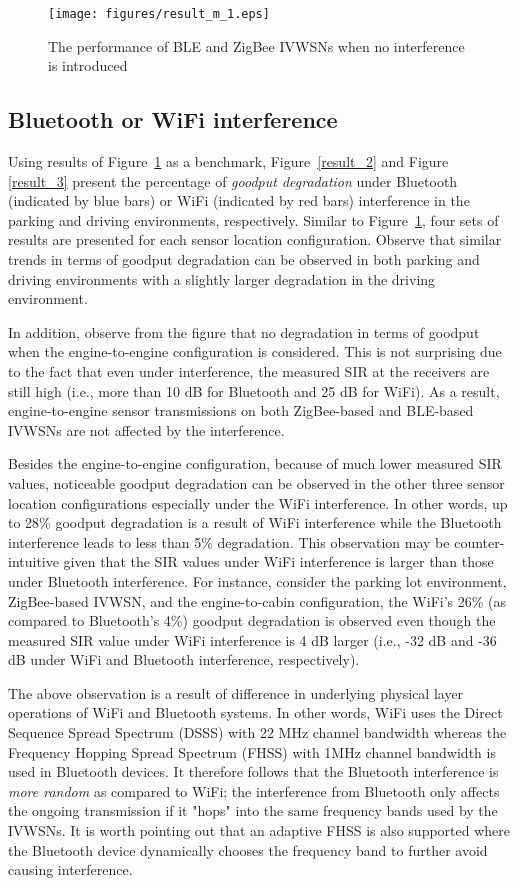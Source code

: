 \documentclass[journal]{IEEEtran}
\begin{document}
\begin{figure}[tbp]
\centering
\texttt{[image: figures/result\_m\_1.eps]}
\caption{The performance of BLE and ZigBee IVWSNs when no interference is introduced}
\label{result_1}
\end{figure}

\subsection{Bluetooth or WiFi interference}


Using results of Figure~\ref{result_1} as a benchmark, Figure~\ref{result_2} and Figure \ref{result_3} present the percentage of \textit{goodput degradation} under Bluetooth (indicated by blue bars) or WiFi (indicated by red bars) interference in the parking and driving environments, respectively. Similar to Figure~\ref{result_1}, four sets of results are presented for each sensor location configuration. Observe that similar trends in terms of goodput degradation can be observed in both parking and driving environments with a slightly larger degradation in the driving environment. 

In addition, observe from the figure that no degradation in terms of goodput when the engine-to-engine configuration is considered. This is not surprising due to the fact that even under interference, the measured SIR at the receivers are still high (i.e., more than 10 dB for Bluetooth and 25 dB for WiFi). As a result, engine-to-engine sensor transmissions on both ZigBee-based and BLE-based IVWSNs are not affected by the interference. 

Besides the engine-to-engine configuration, because of much lower measured SIR values, noticeable goodput degradation can be observed in the other three sensor location configurations especially under the WiFi interference. In other words, up to 28\% goodput degradation is a result of WiFi interference while the Bluetooth interference leads to less than 5\% degradation. This observation may be counter-intuitive given that the SIR values under WiFi interference is larger than those under Bluetooth interference. For instance, consider the parking lot environment, ZigBee-based IVWSN, and the engine-to-cabin configuration, the WiFi's 26\% (as compared to Bluetooth's 4\%) goodput degradation is observed even though the measured SIR value under WiFi interference is 4 dB larger (i.e., -32 dB and -36 dB under WiFi and Bluetooth interference, respectively).

The above observation is a result of difference in underlying physical layer operations of WiFi and Bluetooth systems. In other words, WiFi uses the Direct Sequence Spread Spectrum (DSSS) with 22 MHz channel bandwidth whereas the Frequency Hopping Spread Spectrum (FHSS) with 1MHz channel bandwidth is used in Bluetooth devices. It therefore follows that the Bluetooth interference is \textit{more random} as compared to WiFi; the interference from Bluetooth only affects the ongoing transmission if it "hops" into the same frequency bands used by the IVWSNs.  It is worth pointing out that an adaptive FHSS is also supported where the Bluetooth device dynamically chooses the frequency band to further avoid causing interference. 
\end{document}
